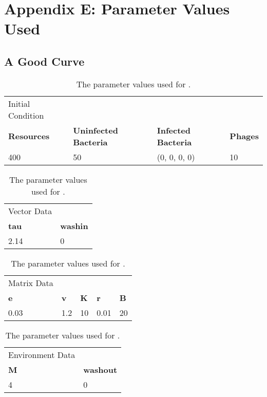 \chapter{Appendix E: Parameter Values Used}
\label{AppendixE}

\section{A Good Curve}
\begin{table}[htbp]
    \small %
    \centering
    \begin{tabularx}{\textwidth}{l l l l}
        \toprule
        Initial Condition\\
        \textbf{Resources} & \textbf{Uninfected Bacteria} & \textbf{Infected Bacteria} & \textbf{Phages} \\
        \midrule
        400 & 50 & (0, 0, 0, 0) & 10 \\
        \bottomrule
    \end{tabularx}\newline
    \begin{tabularx}{\textwidth}{l l}
        \toprule
        Vector Data\\
        \textbf{tau} & \textbf{washin}\\
        \midrule
        2.14 & 0 \\
        \bottomrule
    \end{tabularx}\newline
    \begin{tabularx}{\textwidth}{l l l l l}
        \toprule
        Matrix Data\\
        \textbf{e} & \textbf{v} & \textbf{K} & \textbf{r} & \textbf{B} \\
        \midrule
        0.03 & 1.2 & 10 & 0.01 & 20 \\
        \bottomrule
    \end{tabularx}\newline
    \begin{tabularx}{\textwidth}{l l}
        \toprule
        Environment Data\\
        \textbf{M} & \textbf{washout}\\
        \midrule
        4 & 0 \\
        \bottomrule
    \end{tabularx}\newline
    \caption{
        The parameter values used for . 
    }
    \label{tab:appendixE:a_good_curve}
\end{table}